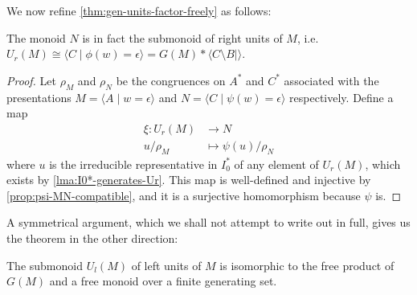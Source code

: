 \documentclass[noindex,noinsetproof,12pt]{lmaths}
\begin{document}
We now refine \cref{thm:gen-units-factor-freely} as follows:

\begin{theorem} \label{thm:spec-units-factor-freely}
	The monoid $N$ is in fact the submonoid of right units of $M$, i.e. $U_r(M) \cong \langle C \mid \phi(w) = \epsilon \rangle = G(M) \ast \langle C \setminus B \mid \rangle$.
\end{theorem}
\begin{proof}
	Let $\rho_M$ and $\rho_N$ be the congruences on $A^*$ and $C^*$ associated with the presentations $M = \langle A \mid w = \epsilon \rangle$ and $N = \langle C \mid \psi(w) = \epsilon\rangle$ respectively.
	Define a map
		\begin{align*}
			\xi : U_r(M) &\to N \\
			 u/\rho_M &\mapsto \psi(u)/\rho_N
		\end{align*}
	where $u$ is the irreducible representative in $I_0^*$ of any element of $U_r(M)$, which exists by \cref{lma:I0*-generates-Ur}. This map is well-defined and injective by \cref{prop:psi-MN-compatible}, and it is a surjective homomorphism because $\psi$ is.
\end{proof}

A symmetrical argument, which we shall not attempt to write out in full, gives us the theorem in the other direction:
\begin{theorem}
	The submonoid $U_l(M)$ of left units of $M$ is isomorphic to the free product of $G(M)$ and a free monoid over a finite generating set.
\end{theorem}
\end{document}
